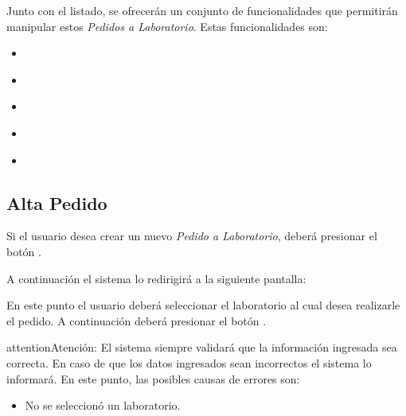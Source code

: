 \documentclass[a4paper,10pt,spanish]{sphinxmanual}
\begin{document}
Junto con el listado, se ofrecerán un conjunto de funcionalidades que permitirán manipular estos \emph{Pedidos a Laboratorio}.
Estas funcionalidades son:
\begin{itemize}
\item {} 
{\hyperref[pedidosalab:alta\string-pl]{}}

\item {} 
{\hyperref[pedidosalab:cancelar\string-pedido\string-pl]{}}

\item {} 
{\hyperref[pedidosalab:ver\string-detalles\string-pl]{}}

\item {} 
{\hyperref[pedidosalab:ver\string-remitos\string-pl]{}}

\item {} 
{\hyperref[pedidosalab:formulario\string-busqueda\string-pl]{}}

\end{itemize}


\subsection{Alta Pedido}
\label{pedidosalab:alta-pl}\label{pedidosalab:alta-pedido}
Si el usuario desea crear un nuevo \emph{Pedido a Laboratorio}, deberá presionar el botón .


A continuación el sistema lo redirigirá a la siguiente pantalla:


En este punto el usuario deberá seleccionar el laboratorio al cual desea realizarle el pedido. A continuación deberá presionar el botón .

\begin{notice}{attention}{Atención:}
El sistema siempre validará que la información ingresada sea correcta. En caso de que los datos ingresados sean incorrectos el sistema lo informará.
En este punto, las posibles causas de errores son:
\begin{itemize}
\item {} 
No se seleccionó un laboratorio.

\end{itemize}
\end{notice}
\end{document}
